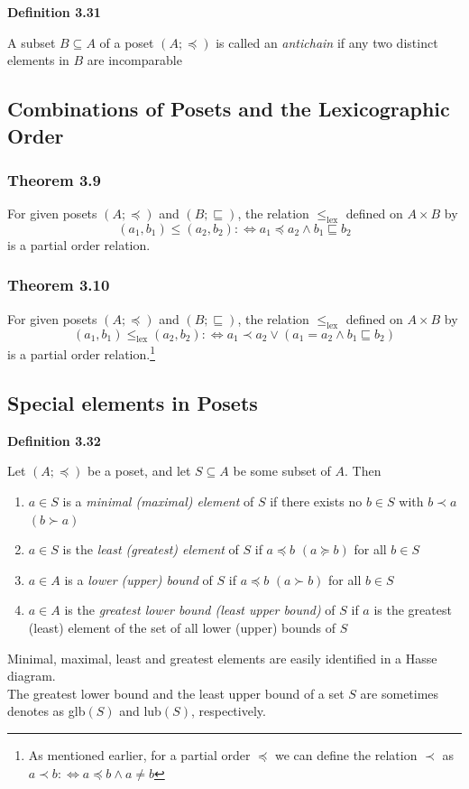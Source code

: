 \documentclass[a4paper]{report}
\newenvironment{definition}[1]{\begin{framed}\centerline{\textbf{Definition #1}}\noindent\hspace{-1.1mm}}{\end{framed}}
\begin{document}
\begin{definition}{3.31}
A subset $B\subseteq A$ of a poset $(A;\preceq)$ is called an \emph{antichain} if any two distinct elements in $B$ are incomparable
\end{definition}

\subsection{Combinations of Posets and the Lexicographic Order}
\subsubsection*{Theorem 3.9}
For given posets $(A;\preceq)$ and $(B;\sqsubseteq)$, the relation $\leq_\text{lex}$ defined on $A\times B$ by \[(a_1,b_1)\leq (a_2,b_2):\Longleftrightarrow a_1\preceq a_2\land b_1\sqsubseteq b_2\]
is a partial order relation.

\subsubsection*{Theorem 3.10}
For given posets $(A;\preceq)$ and $(B;\sqsubseteq)$, the relation $\leq_\text{lex}$ defined on $A\times B$ by \[(a_1,b_1)\leq_\text{lex} (a_2,b_2):\Longleftrightarrow a_1\prec a_2\lor (a_1=a_2\land b_1\sqsubseteq b_2)\]
is a partial order relation.\footnote{As mentioned earlier, for a partial order $\preceq$ we can define the relation $\prec$ as $a\prec b:\Longleftrightarrow a\preceq b\land a\not=b$}

\subsection{Special elements in Posets}
\begin{definition}{3.32}
Let $(A;\preceq)$ be a poset, and let $S\subseteq A$ be some subset of $A$. Then 
\begin{enumerate}
\item $a\in S$ is a \emph{minimal (maximal) element} of $S$ if there exists no $b\in S$ with $b\prec a$ $(b\succ a)$
\item $a\in S$ is the \emph{least (greatest) element} of $S$ if $a\preceq b$ $(a\succeq b)$ for all $b\in S$
\item $a\in A$ is a \emph{lower (upper) bound} of $S$ if $a\preceq b$ $(a\succ b)$ for all $b\in S$
\item $a\in A$ is the \emph{greatest lower bound (least upper bound)} of $S$ if $a$ is the greatest (least) element of the set of all lower (upper) bounds of $S$ 
\end{enumerate}
\end{definition}
Minimal, maximal, least and greatest elements are easily identified in a Hasse diagram. \\
\indent The greatest lower bound and the least upper bound of a set $S$ are sometimes denotes as glb$(S)$ and lub$(S)$, respectively. 
\end{document}
